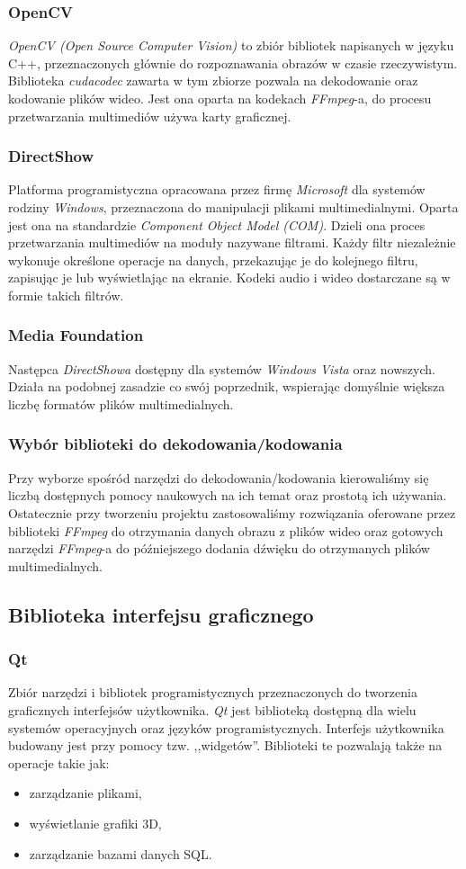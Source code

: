 \documentclass[twoside]{projektInzynierskiMS}
\begin{document}
\subsubsection{OpenCV}
\emph{OpenCV (Open Source Computer Vision)} to zbiór bibliotek napisanych w języku C++, przeznaczonych głównie do rozpoznawania obrazów w czasie rzeczywistym. Biblioteka \emph{cudacodec} zawarta w tym zbiorze pozwala na dekodowanie oraz kodowanie plików wideo. Jest ona oparta na kodekach \emph{FFmpeg}-a, do procesu przetwarzania multimediów używa karty graficznej.
\subsubsection{DirectShow}
Platforma programistyczna opracowana przez firmę \emph{Microsoft} dla systemów rodziny \emph{Windows}, przeznaczona do manipulacji plikami multimedialnymi. Oparta jest ona na standardzie \emph{Component Object Model (COM)}. Dzieli ona proces przetwarzania multimediów na moduły nazywane filtrami. Każdy filtr niezależnie wykonuje określone operacje na danych, przekazując je do kolejnego filtru, zapisując je lub wyświetlając na ekranie. Kodeki audio i wideo dostarczane są w formie takich filtrów.
\subsubsection{Media Foundation}
Następca \emph{DirectShowa} dostępny dla systemów \emph{Windows Vista} oraz nowszych. Działa na podobnej zasadzie co swój poprzednik, wspierając domyślnie większa liczbę formatów plików multimedialnych.
\subsubsection{Wybór biblioteki do dekodowania/kodowania}
Przy wyborze spośród narzędzi do dekodowania/kodowania kierowaliśmy się liczbą dostępnych pomocy naukowych na ich temat oraz prostotą ich używania. Ostatecznie przy tworzeniu projektu zastosowaliśmy rozwiązania oferowane przez biblioteki \emph{FFmpeg} do otrzymania danych obrazu z plików wideo oraz gotowych narzędzi \emph{FFmpeg}-a do późniejszego dodania dźwięku do otrzymanych plików multimedialnych.

\subsection{Biblioteka interfejsu graficznego}

\subsubsection{Qt}
Zbiór narzędzi i bibliotek programistycznych przeznaczonych do tworzenia graficznych interfejsów użytkownika. \emph{Qt} jest biblioteką dostępną dla wielu systemów operacyjnych oraz języków programistycznych. Interfejs użytkownika budowany jest przy pomocy tzw. ,,widgetów''. Biblioteki te pozwalają także na operacje takie jak: 
\begin{itemize}
	\item zarządzanie plikami,
	\item wyświetlanie grafiki 3D,
	\item zarządzanie bazami danych SQL.
\end{itemize}
\end{document}
